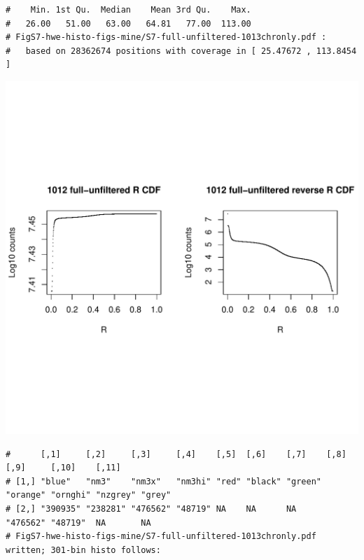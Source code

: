 \documentclass{article}\usepackage[]{graphicx}\usepackage[]{color}
\makeatletter
\def\maxwidth{ %
  \ifdim\Gin@nat@width>\linewidth
    \linewidth
  \else
    \Gin@nat@width
  \fi
}
\newenvironment{kframe}{%
 \def\at@end@of@kframe{}%
 \ifinner\ifhmode%
  \def\at@end@of@kframe{\end{minipage}}%
  \begin{minipage}{\columnwidth}%
 \fi\fi%
 \def\FrameCommand##1{\hskip\@totalleftmargin \hskip-\fboxsep
 \colorbox{shadecolor}{##1}\hskip-\fboxsep
     \hskip-\linewidth \hskip-\@totalleftmargin \hskip\columnwidth}%
 \MakeFramed {\advance\hsize-\width
   \@totalleftmargin\z@ \linewidth\hsize
   \@setminipage}}%
 {\par\unskip\endMakeFramed%
 \at@end@of@kframe}
\newenvironment{knitrout}{}{} %
\makeatother
\begin{document}
\begin{knitrout}
\begin{kframe}
\begin{verbatim}
#    Min. 1st Qu.  Median    Mean 3rd Qu.    Max. 
#   26.00   51.00   63.00   64.81   77.00  113.00 
# FigS7-hwe-histo-figs-mine/S7-full-unfiltered-1013chronly.pdf :
#   based on 28362674 positions with coverage in [ 25.47672 , 113.8454 ]
\end{verbatim}
\end{kframe}
\includegraphics[width=\maxwidth]{FigS7-hwe-histo-figs-knitr/unnamed-chunk-10-4} 
\begin{kframe}\begin{verbatim}
#      [,1]     [,2]     [,3]     [,4]    [,5]  [,6]    [,7]    [,8]     [,9]     [,10]    [,11] 
# [1,] "blue"   "nm3"    "nm3x"   "nm3hi" "red" "black" "green" "orange" "ornghi" "nzgrey" "grey"
# [2,] "390935" "238281" "476562" "48719" NA    NA      NA      "476562" "48719"  NA       NA    
# FigS7-hwe-histo-figs-mine/S7-full-unfiltered-1013chronly.pdf written; 301-bin histo follows:
\end{verbatim}
\end{kframe}

\end{knitrout}
\end{document}
